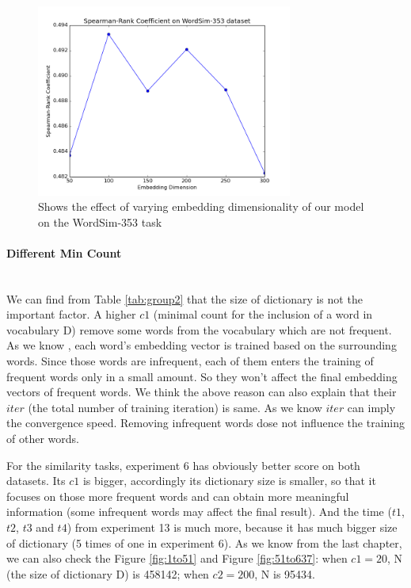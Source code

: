 \begin{figure}[tb]
  \centering
	\includegraphics[width=0.75\textwidth]{vecword353} 
	\caption{Shows the effect of varying embedding dimensionality of our model on the WordSim-353 task}
	\label{fig:vecword353}
\end{figure}




\paragraph{Different Min Count} \ \\
We can find from Table \ref{tab:group2} that the size of dictionary is not the important factor. A higher $c1$ (minimal count for the inclusion of a word in vocabulary \gls{D}) remove some words from the vocabulary which are not frequent. As we know , each word's embedding vector is trained based on the surrounding words. Since those words are infrequent, each of them enters the training of frequent words only in a small amount. So they won't affect the final embedding vectors of frequent words. We think the above reason can also explain that their $iter$ (the total number of training iteration) is same. As we know $iter$ can imply the convergence speed. Removing infrequent words dose not influence the training of other words. 

For the similarity tasks, experiment 6 has obviously better score on both datasets. Its $c1$ is bigger, accordingly its dictionary size is smaller, so that it focuses on those more frequent words and can obtain more meaningful information (some infrequent words may affect the final result). And the time ($t1$, $t2$, $t3$ and $t4$) from experiment 13 is much more, because it has much bigger size of dictionary (5 times of one in experiment 6). As we know from the last chapter, we can also check the Figure \ref{fig:1to51} and Figure \ref{fig:51to637}: when $c1=20$, \gls{N} (the size of dictionary \gls{D}) is 458142; when $c2=200$, \gls{N} is 95434.

